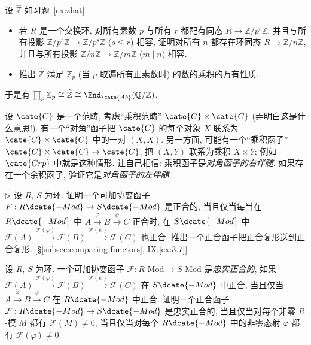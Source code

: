 \begin{prob}\label{ex:zhat-product}
设 $\widehat{\mathbb{Z}}$ 如习题~\ref{ex:zhat}.

\begin{itemize}
\item 若 $R$ 是一个交换环, 对所有素数 $p$ 与所有 $r$ 都配有同态 $R\to\mathbb{Z}/p^r\mathbb{Z}$, 并且与所有投影 $\mathbb{Z}/p^r\mathbb{Z}\to\mathbb{Z}/p^s\mathbb{Z}$ ($s\leq r$) 相容, 证明对所有 $n$ 都存在环同态 $R\to\mathbb{Z}/n\mathbb{Z}$, 并且与所有投影 $\mathbb{Z}/n\mathbb{Z}\to\mathbb{Z}/m\mathbb{Z}$ ($m\mid n$) 相容.
\item 推出 $\widehat{\mathbb{Z}}$ 满足 $\mathbb{Z}_p$ (当 $p$ 取遍所有正素数时) 的数的乘积的万有性质.
\end{itemize}

于是有 $\prod_p\mathbb{Z}_p\cong\widehat{\mathbb{Z}}\cong\End_{\cate{Ab}}(\mathbb{Q}/\mathbb{Z})$.
\end{prob}

\begin{prob}\label{ex:diagonal-adjoint}
设 $\cate{C}$ 是一个范畴, 考虑``乘积范畴'' $\cate{C}\times\cate{C}$ (弄明白这是什么意思!). 有一个``对角''函子把 $\cate{C}$ 的每个对象 $X$ 联系为 $\cate{C}\times\cate{C}$ 中的一对 $(X,X)$. 另一方面, 可能有一个``乘积函子'' $\cate{C}\times\cate{C}\to\cate{C}$, 把 $(X,Y)$ 联系为乘积 $X\times Y$; 例如 $\cate{Grp}$ 中就是这种情形. 让自己相信: 乘积函子是\emph{对角函子的右伴随}. 如果存在一个余积函子, 验证它是\emph{对角函子的左伴随}.
\end{prob}

\begin{prob}\label{ex:exact-functor-complex}
$\triangleright$ 设 $R$, $S$ 为环. 证明一个可加协变函子 $F:R\dcate{-Mod}\to S\dcate{-Mod}$ 是正合的, 当且仅当每当在 $R\dcate{-Mod}$ 中 $A\xrightarrow{\varphi}B\xrightarrow{\psi}C$ 正合时, 在 $S\dcate{-Mod}$ 中 $\mathcal{F}(A)\xrightarrow{\mathcal{F}(\varphi)}\mathcal{F}(B)\xrightarrow{\mathcal{F}(\psi)}\mathcal{F}(C)$ 也正合. 推出一个正合函子把正合复形送到正合复形. [\S\ref{subsec:comparing-functors}, IX.\ref{ex:3.7}]
\end{prob}

\begin{prob}\label{ex:faithfully-exact}
设 $R$, $S$ 为环. 一个可加协变函子 $\mathcal{F}:R\text{-Mod}\to S\text{-Mod}$ 是\emph{忠实正合的}, 如果 $\mathcal{F}(A)\xrightarrow{\mathcal{F}(\varphi)}\mathcal{F}(B)\xrightarrow{\mathcal{F}(\psi)}\mathcal{F}(C)$ 在 $S\dcate{-Mod}$ 中正合, 当且仅当 $A\xrightarrow{\varphi}B\xrightarrow{\psi}C$ 在 $R\dcate{-Mod}$ 中正合. 证明一个正合函子 $\mathcal{F}:R\dcate{-Mod}\to S\dcate{-Mod}$ 是忠实正合的, 当且仅当对每个非零 $R$-模 $M$ 都有 $\mathcal{F}(M)\neq 0$, 当且仅当对每个 $R\dcate{-Mod}$ 中的非零态射 $\varphi$ 都有 $\mathcal{F}(\varphi)\neq 0$.
\end{prob}

